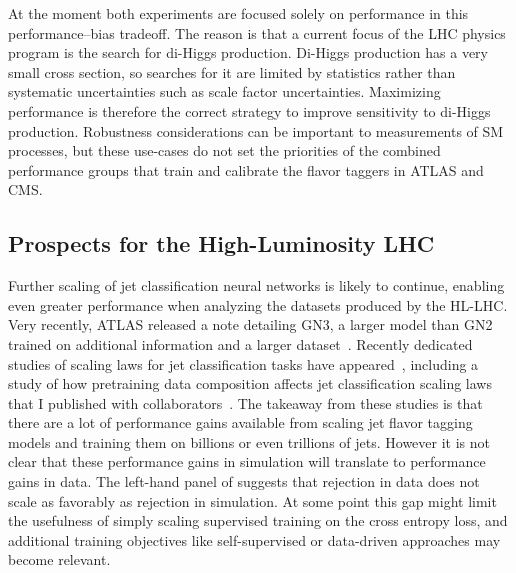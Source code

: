 At the moment both experiments are focused solely on performance in this performance--bias tradeoff.
The reason is that a current focus of the LHC physics program is the search for di-Higgs production.
Di-Higgs production has a very small cross section, so searches for it are limited by statistics rather than systematic uncertainties such as scale factor uncertainties.
Maximizing performance is therefore the correct strategy to improve sensitivity to di-Higgs production.
Robustness considerations can be important to measurements of SM processes, but these use-cases do not set the priorities of the combined performance groups that train and calibrate the flavor taggers in ATLAS and CMS.

\subsection{Prospects for the High-Luminosity LHC}

Further scaling of jet classification neural networks is likely to continue, enabling even greater performance when analyzing the datasets produced by the HL-LHC.
Very recently, ATLAS released a note detailing GN3, a larger model than GN2 trained on additional information and a larger dataset~\cite{ATLAS:2026vyw}.
Recently dedicated studies of scaling laws for jet classification tasks have appeared~\cite{ATLAS:2026xxx, Vigl:2026ppx}, including a study of how pretraining data composition affects jet classification scaling laws that I published with collaborators~\cite{Uslu:2026ywh}.
The takeaway from these studies is that there are a lot of performance gains available from scaling jet flavor tagging models and training them on billions or even trillions of jets.
However it is not clear that these performance gains in simulation will translate to performance gains in data.
The left-hand panel of  suggests that rejection in data does not scale as favorably as rejection in simulation.
At some point this gap might limit the usefulness of simply scaling supervised training on the cross entropy loss, and additional training objectives like self-supervised or data-driven approaches may become relevant.

